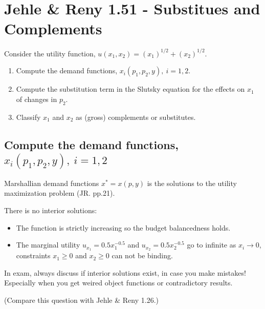 \documentclass{article}
\begin{document}
\section{Jehle \& Reny 1.51 - Substitues and Complements}
Consider the utility function, $u(x_1, x_2) = (x_1)^{1/2} + (x_2)^{1/2}$.

\begin{enumerate}[label=\alph*.]

\item Compute the demand functions, $x_i(p_1, p_2, y), \ i = 1, 2$.

\item Compute the substitution term in the Slutsky equation for the effects on $x_1$ of changes in $p_2$.

\item Classify $x_1$ and $x_2$ as (gross) complements or substitutes.

\end{enumerate}

\subsection{Compute the demand functions, $x_i(p_1, p_2, y), \ i = 1, 2$}

\begin{mdframed}[backgroundcolor=blue!20,linecolor=white]
Marshallian demand functions $x^* = x(p, y)$ is the solutions 
to the utility maximization problem (JR. pp.21).
\end{mdframed}

There is no interior solutions:

\begin{itemize}
\item The function is strictly increasing so the budget balancedness holds. 
\item The marginal utility $u_{x_1} = 0.5x_1^{-0.5}$ and $u_{x_2} = 0.5x_2^{-0.5}$ go to infinite as $x_i \to 0$, constraints $x_1 \ge 0$  and  $x_2 \ge 0$ can not be binding. 
\end{itemize}


\begin{mdframed}[backgroundcolor=yellow!20,linecolor=white]
In exam, always discuss if interior solutions exist, in case you make mistakes! Especially when you get weired object functions or contradictory results.

(Compare this question with Jehle \& Reny 1.26.)
\end{mdframed}
\end{document}
